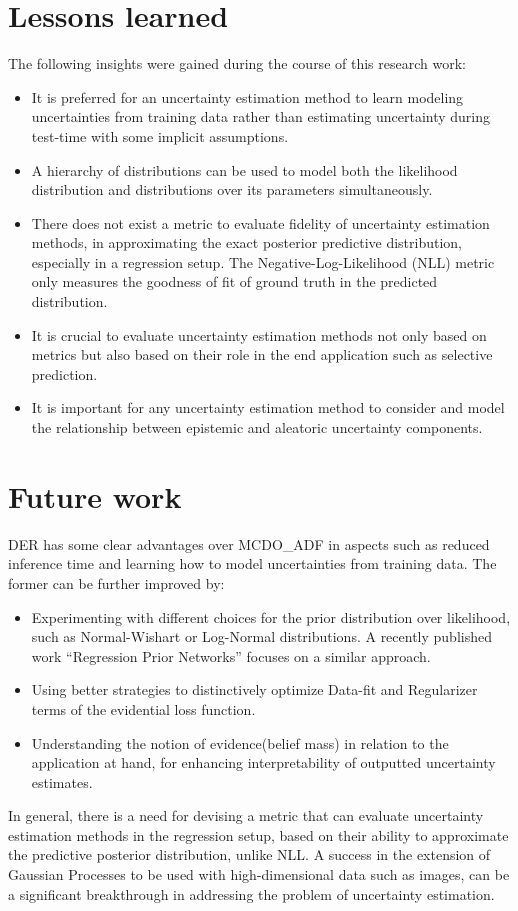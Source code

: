     \section{Lessons learned}
    The following insights were gained during the course of this research work:
    \begin{itemize}
    	\item It is preferred for an uncertainty estimation method to learn modeling uncertainties from training data rather than estimating uncertainty during test-time with some implicit assumptions.
    	\item A hierarchy of distributions can be used to model both the likelihood distribution and distributions over its parameters simultaneously.
    	\item There does not exist a metric  to evaluate fidelity of uncertainty estimation methods, in approximating the exact posterior predictive  distribution, especially in a regression setup. The Negative-Log-Likelihood (NLL) metric only measures the goodness of fit of ground truth in the predicted distribution.
    	\item It is crucial to evaluate uncertainty estimation methods not only based on metrics but also based on their role in the end application such as selective prediction. 
    	\item It is important for any uncertainty estimation method to consider and model the relationship between epistemic and aleatoric uncertainty components.    	
    \end{itemize}

    \section{Future work}
    DER has some clear advantages over MCDO\_ADF in aspects such as reduced inference time and learning how to model uncertainties from training data. The former can be further improved by:
    \begin{itemize}
    	\item Experimenting with different choices for the prior distribution over likelihood, such as Normal-Wishart or Log-Normal distributions. A recently published work \enquote{Regression Prior Networks} focuses on a similar approach.
    	\item Using better strategies to distinctively optimize Data-fit and Regularizer terms of the evidential loss function.
    	\item Understanding the notion of evidence(belief mass) in relation to the application at hand, for enhancing interpretability of outputted uncertainty estimates.
    \end{itemize}

    In general, there is a need for devising a metric that can evaluate uncertainty estimation methods in the regression setup, based on their ability to approximate the predictive posterior distribution, unlike NLL. A success in the extension of Gaussian Processes to be used with high-dimensional data such as images, can be a significant breakthrough in addressing the problem of uncertainty estimation.
    	 
    

